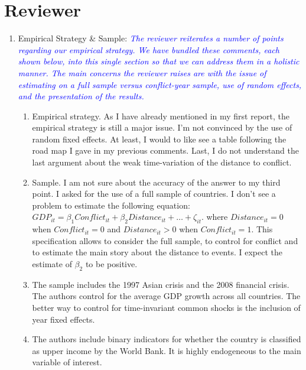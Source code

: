 \section*{Reviewer}

\begin{enumerate}
\item Empirical Strategy \& Sample: \textcolor{blue}{\emph{The reviewer reiterates a number of points regarding our empirical strategy. We have bundled these comments, each shown below, into this single section so that we can address them in a holistic manner. The main concerns the reviewer raises are with the issue of estimating on a full sample versus conflict-year sample, use of random effects, and the presentation of the results.}} \\
\begin{enumerate}
	\item   Empirical strategy. As I have already mentioned in my first report, the empirical strategy is still a major issue. I’m not convinced by the use of random fixed effects. At least, I would to like see a
	table following the road map I gave in my previous comments. Last, I do not understand the last
	argument about the weak time-variation of the distance to conflict. \\

	\item Sample. I am not sure about the accuracy of the answer to my third point. I asked for the use of a
	full sample of countries. I don’t see a problem to estimate the following equation: $GDP_{it} = \beta_{1}Conflict_{it} + \beta_{2}Distance_{it}+\ldots+\zeta_{it}$. where $Distance_{it}=0$ when $Conflict_{it}=0$ and $Distance_{it}>0$ when $Conflict_{it}=1$. This specification allows to consider the full sample, to control for conflict and to estimate the main story about the distance to events. I expect the estimate of $\beta_{2}$ to be positive. \\

	\item The sample includes the 1997 Asian crisis and the 2008 financial crisis. The authors control for the average GDP growth across all countries. The better way to control for time-invariant common shocks is the inclusion of year fixed effects. \\	

	\item  The authors include binary indicators for whether the country is classified as upper income by the World Bank. It is highly endogeneous to the main variable of interest. \\	


\end{enumerate}
\end{enumerate}
